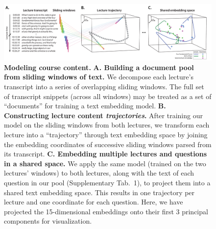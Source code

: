 \documentclass[10pt]{article}
\newcommand{\questions}{1}
\begin{document}
\begin{figure}[tp]
\centering
\includegraphics[width=\textwidth]{figs/sliding_windows}

\caption{\textbf{Modeling course content.} \textbf{A. Building a document pool
from sliding windows of text.} We decompose each lecture's transcript into a
series of overlapping sliding windows. The full set of transcript snippets (across
all windows) may be treated as a set of ``documents'' for training a text
embedding model. \textbf{B. Constructing lecture content
\textit{trajectories}.} After training our model on the sliding windows from
both lectures, we transform each lecture into a ``trajectory'' through text
embedding space by joining the embedding coordinates of successive sliding
windows parsed from its transcript. \textbf{C. Embedding multiple lectures and
questions in a shared space.} We apply the same model (trained on the two
lectures' windows) to both lectures, along with the text of each question in
our pool (Supplementary Tab.~\questions), to project them into a shared text embedding space.
This results in one trajectory per lecture and one coordinate for each
question. Here, we have projected the 15-dimensional embeddings onto their first
3 principal components for visualization.} 

\label{fig:sliding-windows}
\end{figure}
\end{document}
